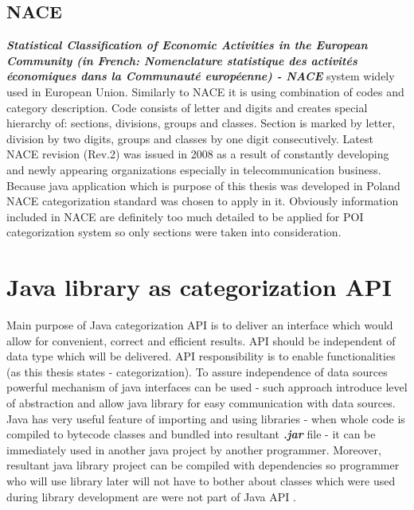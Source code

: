 \subsection{NACE}
\textit{\textbf{Statistical Classification of Economic Activities in the European Community (in French: Nomenclature statistique des activités économiques dans la Communauté européenne) - NACE}} system widely used in European Union. Similarly to NACE it is using combination of codes and category description. Code consists of letter and digits and creates special hierarchy of: sections, divisions, groups and classes. Section is marked by letter, division by two digits, groups and classes by one digit consecutively. Latest NACE revision (Rev.2) was issued in 2008 as a result of constantly developing and  newly appearing organizations especially in telecommunication business.\cite{17} \cite{18} Because java application which is purpose of this thesis was developed in Poland NACE categorization standard was chosen to apply in it. Obviously information included in NACE are definitely too much detailed to be applied for POI categorization system so only sections were taken into consideration. 

\section{Java library as categorization API}
Main purpose of Java categorization API is to deliver an interface which would allow for convenient, correct and efficient results. API should be independent of data type which will be delivered. API responsibility is to enable functionalities (as this thesis states - categorization). To assure independence of data sources powerful mechanism of java interfaces can be used - such approach introduce level of abstraction and allow java library for easy communication with data sources. Java has very useful feature of importing and using libraries - when whole code is compiled to bytecode classes and bundled into resultant \textbf{\textit{.jar}} file - it can be immediately used in another java project by another programmer. Moreover, resultant java library project can be compiled with dependencies so programmer who will use library later will not have to bother about classes which were used during library development are were not part of Java API \cite{19}.   

